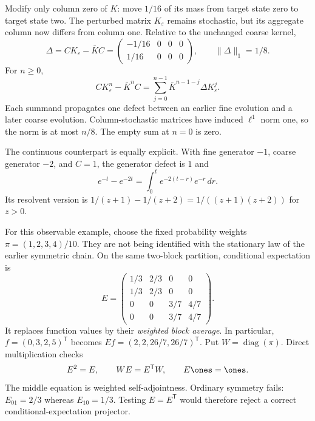 Modify only column zero of $K$: move $1/16$ of its mass from target state zero to target state two. The perturbed matrix $K_\varepsilon$ remains stochastic, but its aggregate column now differs from column one. Relative to the unchanged coarse kernel,
\[
\Delta=CK_\varepsilon-\bar KC
=\begin{pmatrix}-1/16&0&0&0\\1/16&0&0&0\end{pmatrix},
\qquad \|\Delta\|_1=1/8.
\]
For $n\ge0$,
\[
CK_\varepsilon^n-\bar K^nC
=\sum_{j=0}^{n-1}\bar K^{n-1-j}\Delta K_\varepsilon^j.
\]
Each summand propagates one defect between an earlier fine evolution and a later coarse evolution. Column-stochastic matrices have induced $\ell^1$ norm one, so the norm is at most $n/8$. The empty sum at $n=0$ is zero.

The continuous counterpart is equally explicit. With fine generator $-1$, coarse generator $-2$, and $C=1$, the generator defect is $1$ and
\[
e^{-t}-e^{-2t}=\int_0^t e^{-2(t-r)}e^{-r}\,dr.
\]
Its resolvent version is $1/(z+1)-1/(z+2)=1/((z+1)(z+2))$ for $z>0$.

For this observable example, choose the fixed probability weights $\pi=(1,2,3,4)/10$. They are not being identified with the stationary law of the earlier symmetric chain. On the same two-block partition, conditional expectation is
\[
E=\begin{pmatrix}
1/3&2/3&0&0\\1/3&2/3&0&0\\0&0&3/7&4/7\\0&0&3/7&4/7
\end{pmatrix}.
\]
It replaces function values by their \emph{weighted block average}. In particular, $f=(0,3,2,5)^{\mathsf T}$ becomes $Ef=(2,2,26/7,26/7)^{\mathsf T}$.
Put $W=\operatorname{diag}(\pi)$. Direct multiplication checks
\[
E^2=E,\qquad WE=E^{\mathsf T}W,\qquad E\ones=\ones.
\]
The middle equation is weighted self-adjointness. Ordinary symmetry fails: $E_{01}=2/3$ whereas $E_{10}=1/3$. Testing $E=E^{\mathsf T}$ would therefore reject a correct conditional-expectation projector.

